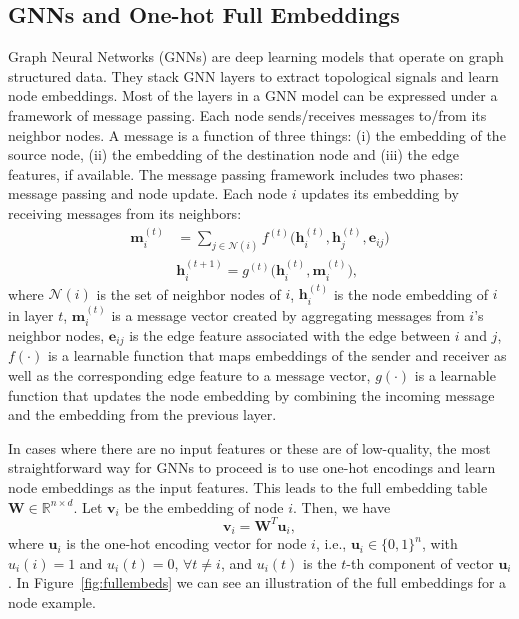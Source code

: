 \documentclass[conference]{IEEEtran}
\begin{document}
\subsection{GNNs and One-hot Full Embeddings}
Graph Neural Networks (GNNs) are deep learning models that operate on graph structured data. They stack GNN layers to extract topological signals and learn node embeddings.
Most of the layers in a GNN model can be expressed under a framework of message passing. Each node sends/receives messages to/from its neighbor nodes. A message is a function of three things: (i) the embedding of the source node, (ii) the embedding of the destination node and (iii) the edge features, if available.
% 
The message passing framework includes two phases: message passing and node update. Each node $i$ updates its embedding by receiving messages from its neighbors:
\begin{equation}
\label{message_passing}
\begin{aligned}
    \mathbf{m}_i^{(t)} &= \sum_{j \in \mathcal{N}(i)} f^{(t)} \Big( \mathbf{h}_i^{(t)}, \mathbf{h}_j^{(t)}, \mathbf{e}_{ij} \Big) \\
    &\mathbf{h}_i^{(t+1)} = g^{(t)} \Big( \mathbf{h}_i^{(t)}, \mathbf{m}_i^{(t)} \Big),
\end{aligned}
\end{equation}
where $\mathcal{N}(i)$ is the set of neighbor nodes of $i$, $\mathbf{h}_i^{(t)}$ is the node embedding of $i$ in layer $t$, $\mathbf{m}_i^{(t)}$ is a message vector created by aggregating messages from $i$’s neighbor nodes, $\mathbf{e}_{ij}$ is the edge feature associated with the edge between $i$ and $j$, $f(\cdot)$ is a learnable function that maps embeddings of the sender and receiver as well as the corresponding edge feature to a message vector, $g(\cdot)$ is a learnable function that updates the node embedding by combining the incoming message and the embedding from the previous layer. 

In cases where there are no input features or these are of low-quality, the most straightforward way for GNNs to proceed is to use one-hot encodings and learn node embeddings as the input features. This leads to the full embedding table $\mathbf{W} \in \mathbb{R}^{n\times d}$. 
Let $\mathbf{v}_i$ be the embedding of node $i$. Then, we have
\begin{equation}
    \mathbf{v}_i = \mathbf{W}^T \mathbf{u}_i,
\end{equation}
where $\mathbf{u}_i$ is the one-hot encoding vector for node $i$, i.e., $\mathbf{u}_i \in \{0,1\}^n$, with $u_i(i)=1$ and $u_i(t)=0$, $\forall t \neq i$, and $u_i(t)$ is the $t$-th component of vector $\mathbf{u}_i$. 
In Figure~\ref{fig:fullembeds} we can see an illustration of the full embeddings for a node example.
\end{document}
